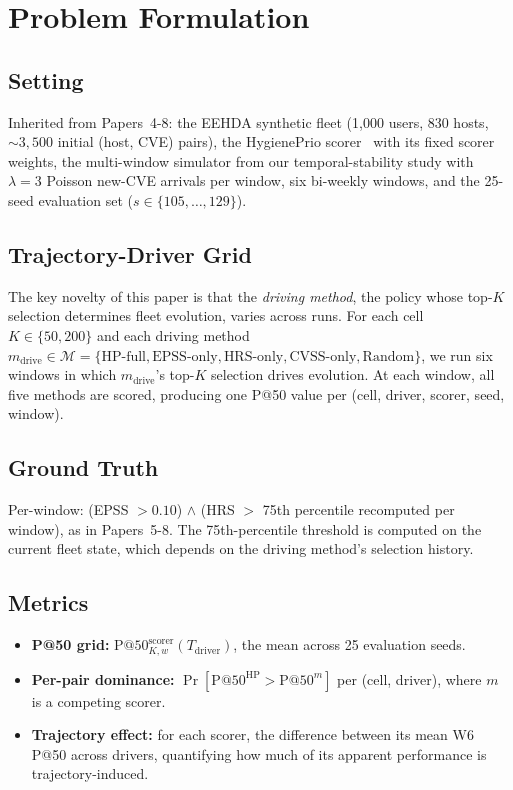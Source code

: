 \section{Problem Formulation}
\label{sec:problem}

\subsection{Setting}

Inherited from Papers~4-8: the EEHDA synthetic fleet (1{,}000 users,
830 hosts, $\sim 3{,}500$ initial (host, CVE) pairs), the HygienePrio
scorer~\cite{paper4hygieneprio} with its fixed scorer weights, the
multi-window simulator from our temporal-stability study with $\lambda = 3$ Poisson
new-CVE arrivals per window, six bi-weekly windows, and the 25-seed
evaluation set ($s \in \{105, \ldots, 129\}$).

\subsection{Trajectory-Driver Grid}

The key novelty of this paper is that the \textit{driving method}, 
the policy whose top-$K$ selection determines fleet evolution, varies
across runs. For each cell $K \in \{50, 200\}$ and each driving method
$m_{\text{drive}} \in \mathcal{M} = \{\text{HP-full}, \text{EPSS-only},
\text{HRS-only}, \text{CVSS-only}, \text{Random}\}$, we run six windows
in which $m_{\text{drive}}$'s top-$K$ selection drives evolution. At
each window, all five methods are scored, producing one P@50 value per
(cell, driver, scorer, seed, window).

\subsection{Ground Truth}

Per-window: (EPSS $> 0.10$) $\wedge$ (HRS $>$ 75th percentile recomputed
per window), as in Papers~5-8. The 75th-percentile threshold is computed
on the current fleet state, which depends on the driving method's
selection history.

\subsection{Metrics}

\begin{itemize}
\item \textbf{P@50 grid:} $\mathrm{P@50}^{\mathrm{scorer}}_{K, w}(T_{\mathrm{driver}})$,
the mean across 25 evaluation seeds.
\item \textbf{Per-pair dominance:} $\Pr[\mathrm{P@50}^{\mathrm{HP}} >
\mathrm{P@50}^{m}]$ per (cell, driver), where $m$ is a competing scorer.
\item \textbf{Trajectory effect:} for each scorer, the difference
between its mean W6 P@50 across drivers, quantifying how much of its
apparent performance is trajectory-induced.
\end{itemize}

